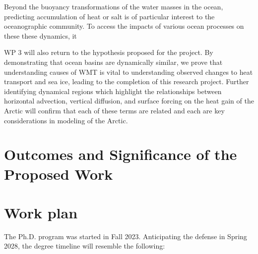 \documentclass[a4paper,12pt]{article}
\begin{document}
    Beyond the buoyancy transformations of the water masses in the ocean, predicting accumulation of heat or salt is of particular interest to the oceanographic community. To access the impacts of various ocean processes on these these dynamics, it 

    WP 3 will also return to the hypothesis proposed for the project. By demonstrating that ocean basins are dynamically similar, we prove that understanding causes of WMT is vital to understanding observed changes to heat transport and sea ice, leading to the completion of this research project. Further identifying dynamical regions which highlight the relationships between horizontal advection, vertical diffusion, and surface forcing on the heat gain of the Arctic will confirm that each of these terms are related and each are key considerations in modeling of the Arctic.

    \newpage
    \section{Outcomes and Significance of the Proposed Work}
	
     
    

    \section{Work plan}
    The Ph.D. program was started in Fall 2023. Anticipating the defense in Spring 2028, the degree timeline will resemble the following:
\end{document}
